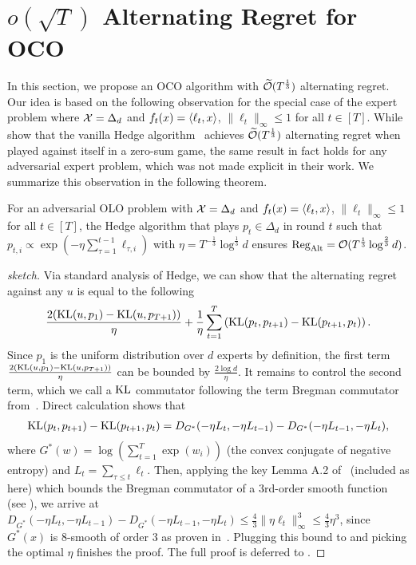 \section{$o(\sqrt{T})$ Alternating Regret for OCO}\label{sec: alt-oco}
In this section, we propose an OCO algorithm with $\widetilde{\mathcal{O}}(T^{\frac{1}{3}})$ alternating regret.
Our idea is based on the following observation for the special case of the expert problem where ${\mathcal{X}}=\Delta_d$ and $f_t(x) = \left\langle {\ell_t,x} \right\rangle$, $\|\ell_t\|_{\infty}\leq 1$ for all $t\in[T]$. 
While~\citet{wibisono2022alternating} show that the vanilla Hedge algorithm~\citep{freund1997decision} achieves $\widetilde{\mathcal{O}}(T^{\frac{1}{3}})$ alternating regret when played against itself in a zero-sum game, 
the same result in fact holds for any adversarial expert problem, which was not made explicit in their work.
We summarize this observation in the following theorem.

\begin{theorem}\label{thm:hedge_simplex}
For an adversarial OLO problem with ${\mathcal{X}}=\Delta_d$ and $f_t(x) = \left\langle {\ell_t,x} \right\rangle$, $\|\ell_t\|_{\infty}\leq 1$ for all $t\in[T]$,
the Hedge algorithm that plays $p_t \in\Delta_d$ in round $t$ such that $p_{t,i} \propto \exp{(-\eta \sum_{\tau=1}^{t-1} \ell_{\tau,i})}$ with
$\eta = T^{-\frac{1}{3}}\log^{\frac{1}{3}}d$ ensures $\mathrm{Reg}_{\mathrm{Alt}}=\mathcal{O}(T^{\frac{1}{3}}\log^{\frac{2}{3}}d)$.
\end{theorem}
\begin{proof}[sketch]
Via standard analysis of Hedge, we can show that the alternating regret against any $u$ is equal to the following 
\begin{align}\label{eqn:alt-regret-simplex-main}
    \frac{2(\text{\rm KL}(u,p_1)-\text{\rm KL}(u,p_{T+1}))}{\eta} + \frac{1}{\eta}\sum_{t=1}^T\left(\text{\rm KL}(p_t,p_{t+1})-\text{\rm KL}(p_{t+1},p_{t})\right).
\end{align}
Since $p_1$ is the uniform distribution over $d$ experts by definition, the first term $\frac{2(\text{\rm KL}(u,p_1)-\text{\rm KL}(u,p_{T+1}))}{\eta}$ can be bounded by $\frac{2\log d}{\eta}$. It remains to control the second term, which we call a $\text{\rm KL}$ commutator following the term Bregman commutator from~\citet{wibisono2022alternating}. Direct calculation shows that 
\begin{align*}
    \text{\rm KL}(p_t,p_{t+1})-\text{\rm KL}(p_{t+1},p_t) = D_{G^*}(-\eta L_t,-\eta L_{t-1}) - D_{G^*}(-\eta L_{t-1},-\eta L_{t}),
\end{align*}
where $G^*(w)=\log(\sum_{t=1}^T\exp(w_i))$ (the convex conjugate of negative entropy) and $L_t=\sum_{\tau\leq t}\ell_t$.
Then, applying the key Lemma A.2 of~\citet{wibisono2022alternating} (included as  here)
which bounds the Bregman commutator of a 3rd-order smooth function (see ), we arrive at $D_{G^*}(-\eta L_t,-\eta L_{t-1}) - D_{G^*}(-\eta L_{t-1},-\eta L_{t})\leq \frac{4}{3}\|\eta\ell_t\|_{\infty}^3\leq \frac{4}{3}\eta^3$, since $G^*(x)$ is $8$-smooth of order 3 as proven in~\citet[Example A.3]{wibisono2022alternating}. Plugging this bound to  and picking the optimal $\eta$ finishes the proof.
The full proof is deferred to .
\end{proof}

